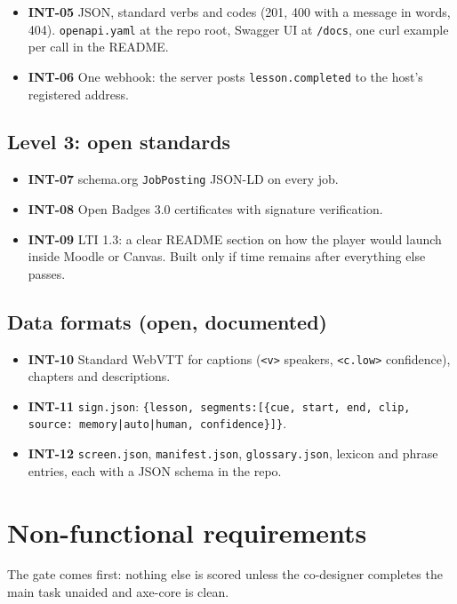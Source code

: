 \documentclass[11pt,a4paper]{article}
\newcommand{\code}[1]{\texttt{#1}}
\newcommand{\req}[1]{\textbf{#1}}
\begin{document}
\begin{itemize}
  \item \req{INT-05} JSON, standard verbs and codes (201, 400 with a message in words, 404). \code{openapi.yaml} at the repo root, Swagger UI at \code{/docs}, one curl example per call in the README.
  \item \req{INT-06} One webhook: the server posts \code{lesson.completed} to the host's registered address.
\end{itemize}

\subsection{Level 3: open standards}
\begin{itemize}
  \item \req{INT-07} schema.org \code{JobPosting} JSON-LD on every job.
  \item \req{INT-08} Open Badges 3.0 certificates with signature verification.
  \item \req{INT-09} LTI 1.3: a clear README section on how the player would launch inside Moodle or Canvas. Built only if time remains after everything else passes.
\end{itemize}

\subsection{Data formats (open, documented)}
\begin{itemize}
  \item \req{INT-10} Standard WebVTT for captions (\code{<v>} speakers, \code{<c.low>} confidence), chapters and descriptions.
  \item \req{INT-11} \code{sign.json}: \code{\{lesson, segments:[\{cue, start, end, clip,} \code{source: memory|auto|human, confidence\}]\}}.
  \item \req{INT-12} \code{screen.json}, \code{manifest.json}, \code{glossary.json}, lexicon and phrase entries, each with a JSON schema in the repo.
\end{itemize}

\section{Non-functional requirements}

The gate comes first: nothing else is scored unless the co-designer completes the main task unaided and axe-core is clean.
\end{document}
